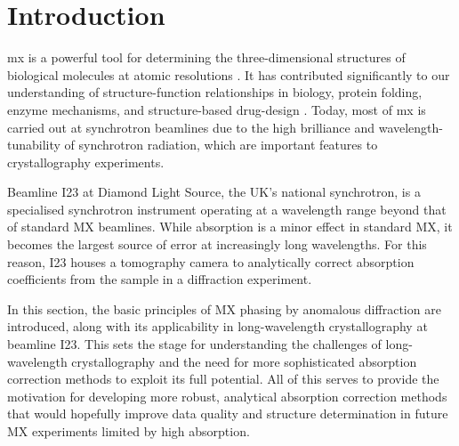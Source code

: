 \section{Introduction}


\ac{mx} is a powerful tool for determining the three-dimensional structures of biological molecules at atomic resolutions \cite{Gorrec2021}. It has contributed significantly to our understanding of structure-function relationships in biology, protein folding, enzyme mechanisms, and structure-based drug-design \cite{Foerster2019}. Today, most of \ac{mx} is carried out at synchrotron beamlines due to the high brilliance and wavelength-tunability of synchrotron radiation, which are important features to crystallography experiments.

Beamline I23 at Diamond Light Source, the UK's national synchrotron, is a specialised synchrotron instrument operating at a wavelength range beyond that of standard MX beamlines. While absorption is a minor effect in standard MX, it becomes the largest source of error at increasingly long wavelengths. For this reason, I23 houses a tomography camera to analytically correct absorption coefficients from the sample in a diffraction experiment.


In this section, the basic principles of MX phasing by anomalous diffraction are introduced, along with its applicability in long-wavelength crystallography at beamline I23. This sets the stage for understanding the challenges of long-wavelength crystallography and the need for more sophisticated absorption correction methods to exploit its full potential. 
All of this serves to provide the motivation for developing more robust, analytical absorption correction methods that would hopefully improve data quality and structure determination in future MX experiments limited by high absorption.

